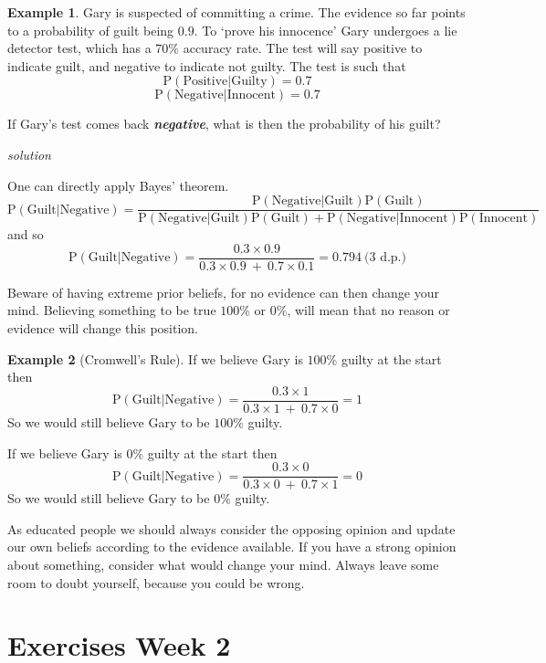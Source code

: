 \documentclass[
]{book}
\theoremstyle{definition}
\theoremstyle{definition}
\newtheorem{example}{Example}[chapter]
\theoremstyle{definition}
\theoremstyle{definition}
\theoremstyle{remark}
\begin{document}
\begin{example}
Gary is suspected of committing a crime. The evidence so far points to a probability of guilt being \(0.9\). To `prove his innocence' Gary undergoes a lie detector test, which has a \(70\%\) accuracy rate. The test will say positive to indicate guilt, and negative to indicate not guilty. The test is such that
\[\text{P}(\text{Positive}|\text{Guilty}) = 0.7\]
\[\text{P}(\text{Negative}|\text{Innocent})=0.7\]

If Gary's test comes back \textbf{\emph{negative}}, what is then the probability of his guilt?

\emph{solution}

One can directly apply Bayes' theorem.
\[\text{P}(\text{Guilt}|\text{Negative})=\frac{\text{P}(\text{Negative}|\text{Guilt})\text{P}(\text{Guilt})}{\text{P}(\text{Negative}|\text{Guilt})\text{P}(\text{Guilt})+\text{P}(\text{Negative}|\text{Innocent})\text{P}(\text{Innocent})}\]
and so
\[\text{P}(\text{Guilt}|\text{Negative})=\frac{0.3\times 0.9}{0.3\times 0.9 \ + \ 0.7\times 0.1}=0.794 \ \text{(3 d.p.)}\]
\end{example}

Beware of having extreme prior beliefs, for no evidence can then change your mind. Believing something to be true \(100\%\) or \(0\%\), will mean that no reason or evidence will change this position.

\begin{example}[Cromwell's Rule]
If we believe Gary is \(100\%\) guilty at the start then
\[\text{P}(\text{Guilt}|\text{Negative})=\frac{0.3\times 1}{0.3\times 1 \ + \ 0.7\times 0}=1\]
So we would still believe Gary to be \(100\%\) guilty.

If we believe Gary is \(0\%\) guilty at the start then
\[\text{P}(\text{Guilt}|\text{Negative})=\frac{0.3\times 0}{0.3\times 0 \ + \ 0.7\times 1}=0\]
So we would still believe Gary to be \(0\%\) guilty.
\end{example}

As educated people we should always consider the opposing opinion and update our own beliefs according to the evidence available. If you have a strong opinion about something, consider what would change your mind. Always leave some room to doubt yourself, because you could be wrong.

\hypertarget{exercises-week-2}{%
\section{Exercises Week 2}\label{exercises-week-2}}
\end{document}
